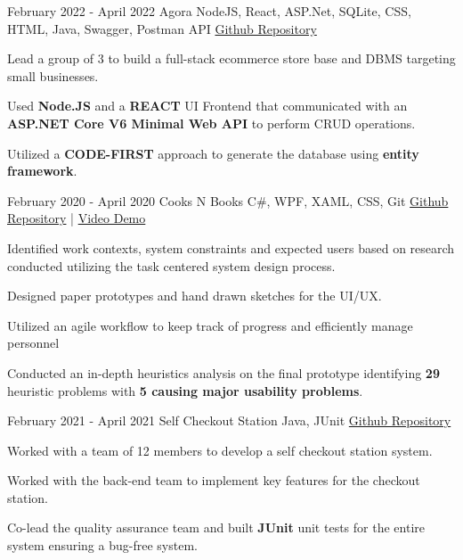 \documentclass[]{awesome-cv}
\begin{document}
\vspace{-11mm}
\vspace{-4mm}
\begin{cventries}
	  \cventry
	{February 2022 - April 2022}
    {Agora}
	{NodeJS, React, ASP.Net, SQLite, CSS, HTML, Java, Swagger, Postman API}
	{\href{https://github.com/krang-8/Agora}{Github Repository}}
    {
      \begin{cvitems} %
        \item {Lead a group of 3 to build a full-stack ecommerce store base and DBMS targeting small businesses.}
        \item {Used \textbf{Node.JS} and a \textbf{REACT }UI Frontend that communicated with an \textbf{ASP.NET Core V6 Minimal Web API} to perform CRUD operations.}
        \item {Utilized a \textbf{CODE-FIRST} approach to generate the database using \textbf{entity framework}.}
      \end{cvitems}
    }
    	\vspace{1mm}
    \vspace{-2mm}

		  \cventry
	{February 2020 - April 2020}
	{Cooks N Books}
	{C\#, WPF, XAML, CSS, Git }
	{\href{https://github.com/krang-8/cooksNbooks}{Github Repository} |
    \href{https://youtu.be/T2AeUoRPRzU}{Video Demo}}
    {
      \begin{cvitems} %
        \item {Identified work contexts, system constraints and expected users based on research conducted utilizing the task centered system design process.}
        \item {Designed paper prototypes and hand drawn sketches for the UI/UX.}
        \item {Utilized an agile workflow to keep track of progress and efficiently manage personnel}
        \item { Conducted an in-depth heuristics analysis on the final prototype identifying \textbf{29} heuristic problems with \textbf{5 
causing major usability problems}.}
      \end{cvitems}
    }
        	\vspace{1mm}
	  \cventry
	{February 2021 - April 2021}
    {Self Checkout Station}
	{Java, JUnit}
	{\href{https://github.com/krang-8/SENG-300-Iteration-3}{Github Repository}}
    {
      \begin{cvitems} %
        \item {Worked with a team of 12 members to develop a self checkout station system.}
        \item {Worked with the back-end team to implement key features for the checkout station.}
        \item {Co-lead the quality assurance team and built \textbf{JUnit} unit tests for the entire system ensuring a bug-free system.}
      \end{cvitems}
    }
    	\vspace{1mm}


\end{cventries}
\end{document}
